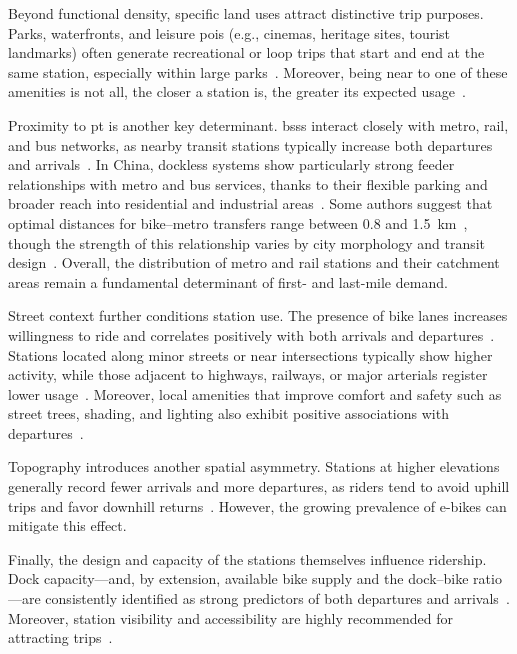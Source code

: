         Beyond functional density, specific land uses attract distinctive trip purposes. Parks, waterfronts, and leisure \acp{poi} (e.g., cinemas, heritage sites, tourist landmarks) often generate recreational or loop trips that start and end at the same station, especially within large parks~\cite{Tran2015, MateoBabiano2016}. Moreover, being near to one of these amenities is not all, the closer a station is, the greater its expected usage~\cite{Wang2016}.

        Proximity to \ac{pt} is another key determinant. \acp{bss} interact closely with metro, rail, and bus networks, as nearby transit stations typically increase both departures and arrivals~\cite{Tran2015, Lee2021}. In China, dockless systems show particularly strong feeder relationships with metro and bus services, thanks to their flexible parking and broader reach into residential and industrial areas~\cite{Guo2020, Guo2021Dockless, Ji2020}. Some authors suggest that optimal distances for bike–metro transfers range between 0.8 and 1.5~km~\cite{Zhao2017}, though the strength of this relationship varies by city morphology and transit design~\cite{Lin2018}. Overall, the distribution of metro and rail stations and their catchment areas remain a fundamental determinant of first- and last-mile demand.

        Street context further conditions station use. The presence of bike lanes increases willingness to ride and correlates positively with both arrivals and departures~\cite{ElAssi2017}. Stations located along minor streets or near intersections typically show higher activity, while those adjacent to highways, railways, or major arterials register lower usage~\cite{FaghihImani2014, FaghihImani2016, FaghihImani2016SpatioTemporal, ElAssi2017}. Moreover, local amenities that improve comfort and safety such as street trees, shading, and lighting also exhibit positive associations with departures~\cite{Liu2019}.

        Topography introduces another spatial asymmetry. Stations at higher elevations generally record fewer arrivals and more departures, as riders tend to avoid uphill trips and favor downhill returns~\cite{Morency2015, MateoBabiano2016}. However, the growing prevalence of e-bikes can mitigate this effect.

        Finally, the design and capacity of the stations themselves influence ridership. Dock capacity—and, by extension, available bike supply and the dock–bike ratio—are consistently identified as strong predictors of both departures and arrivals~\cite{ElAssi2017, Yang2020, Zhao2021}. Moreover, station visibility and accessibility are highly recommended for attracting trips~\cite{Ferrando2007, Yanocha2018, CROW2006}.

